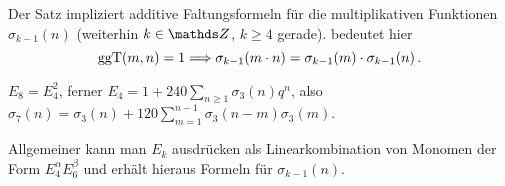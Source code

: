 \begin{beme}
	Der Satz impliziert additive Faltungsformeln für die multiplikativen Funktionen $\sigma_{k-1} (n)$ (weiterhin $k \in \ZZ$, $k \geq 4$ gerade).  bedeutet hier
	\[
	\operatorname{ggT} (m,n) = 1 \Longrightarrow \sigma_{k-1}(m \cdot n) = \sigma_{k-1}(m)\cdot \sigma_{k-1}(n)
	\,.
	\]
\end{beme}

\begin{bsp}
	$E_8 = E_4^2$, ferner $E_4 = 1 + 240 \sum_{n \geq 1} \sigma_3(n) q^n$, also $\sigma_7 (n) = \sigma_3 (n) + 120 \sum_{m=1}^{n-1} \sigma_3 (n-m) \sigma_3 (m)$.
	
	Allgemeiner kann man $E_k$ ausdrücken als Linearkombination von Monomen der Form $E_4^\alpha E_6^\beta$ und erhält hieraus Formeln für $\sigma_{k-1}(n)$.
\end{bsp}